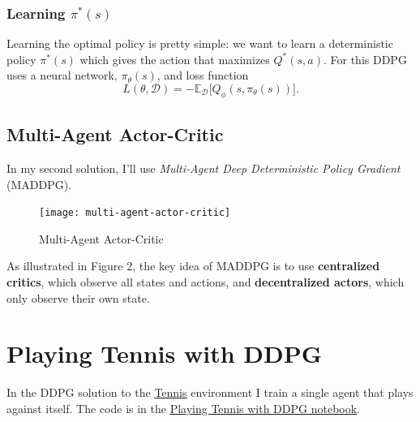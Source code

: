 \documentclass[sigchi]{acmart}
\begin{document}
\subsubsection{Learning $\pi^*(s)$}

Learning the optimal policy is pretty simple: we want to learn a deterministic policy $\pi^*(s)$ which gives the action that maximizes $Q^*(s, a)$.
For this DDPG uses a neural network, $\pi_\theta(s)$, and loss function
$$L(\theta, \mathcal{D}) = -\mathbb{E}_{\mathcal{D}}\big[Q_\phi(s,\pi_\theta(s))\big].$$
 
\subsection{Multi-Agent Actor-Critic}

In my second solution, I'll use {\em Multi-Agent Deep Deterministic Policy Gradient}~\cite{DBLP:journals/corr/LoweWTHAM17} (MADDPG).  

\begin{figure}[h]
	\centering
	\texttt{[image: multi-agent-actor-critic]}
	\label{fig:ma-ac}
	\caption{Multi-Agent Actor-Critic~\cite{DBLP:journals/corr/LoweWTHAM17}}
\end{figure}

As illustrated in Figure 2, the key idea of MADDPG is to use \textbf{centralized critics}, which observe all states and actions, and 
 \textbf{decentralized actors}, which only observe their own state.
 

\section{Playing Tennis with DDPG}

In the DDPG solution to the 
\href{https://github.com/Unity-Technologies/ml-agents/blob/master/docs/Learning-Environment-Examples.md#tennis}{\underline{Tennis}}
environment I train a single agent that plays against itself. The code is in the 
\href{https://nbviewer.jupyter.org/github/bobflagg/Collaboration-and-Competition/blob/master/01-Playing-Tennis-with-DDPG.ipynb}{\underline{Playing Tennis with DDPG notebook}}.
\end{document}
